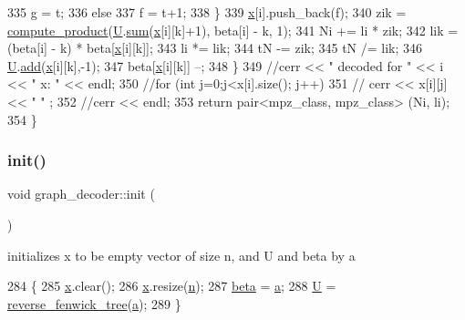 \begin{DoxyCode}
335         g = t;
336       \textcolor{keywordflow}{else}
337         f = t+1;
338     \}
339     \hyperlink{classgraph__decoder_aa3f2776afe387668cf7f68109428e14e}{x}[i].push\_back(f);
340     zik = \hyperlink{compression__helper_8cpp_ae2afb43aabe50f7d42aae8f82b5a35f4}{compute\_product}(\hyperlink{classgraph__decoder_a2fa9fec2cef06aaa410e57fb59d5c1ad}{U}.\hyperlink{classreverse__fenwick__tree_a672731fd6395b4853430073a099a80e6}{sum}(\hyperlink{classgraph__decoder_aa3f2776afe387668cf7f68109428e14e}{x}[i][k]+1), beta[i] - k, 1);
341     Ni += li * zik;
342     lik = (beta[i] - k) * beta[\hyperlink{classgraph__decoder_aa3f2776afe387668cf7f68109428e14e}{x}[i][k]];
343     li *= lik;
344     tN -= zik;
345     tN /= lik;
346     \hyperlink{classgraph__decoder_a2fa9fec2cef06aaa410e57fb59d5c1ad}{U}.\hyperlink{classreverse__fenwick__tree_a942d7f49b37e53ebfec3076d177691d7}{add}(\hyperlink{classgraph__decoder_aa3f2776afe387668cf7f68109428e14e}{x}[i][k],-1);
347     beta[\hyperlink{classgraph__decoder_aa3f2776afe387668cf7f68109428e14e}{x}[i][k]] --;
348   \}
349   \textcolor{comment}{//cerr << " decoded for " << i << " x: " << endl;}
350   \textcolor{comment}{//for (int j=0;j<x[i].size(); j++)}
351   \textcolor{comment}{//  cerr << x[i][j] << " " ;}
352   \textcolor{comment}{//cerr << endl;}
353   \textcolor{keywordflow}{return} pair<mpz\_class, mpz\_class> (Ni, li);
354 \}
\end{DoxyCode}
\mbox{\label{classgraph__decoder_a97a9dcd5af21ece86fa91adcb41ca9cc}} 
\subsubsection{\texorpdfstring{init()}{init()}}
{\footnotesize\ttfamily void graph\+\_\+decoder\+::init (\begin{DoxyParamCaption}{ }\end{DoxyParamCaption})}



initializes x to be empty vector of size n, and U and beta by a 


\begin{DoxyCode}
284 \{
285   \hyperlink{classgraph__decoder_aa3f2776afe387668cf7f68109428e14e}{x}.clear();
286   \hyperlink{classgraph__decoder_aa3f2776afe387668cf7f68109428e14e}{x}.resize(\hyperlink{classgraph__decoder_a6bc1e72b2f7a913d14b789a6c2d92c1e}{n});
287   \hyperlink{classgraph__decoder_aa57c11e4c09c52101682ff83286162f7}{beta} = \hyperlink{classgraph__decoder_a9dd7c3c11b8a45a12cb7c3c2d2bfa2cc}{a};
288   \hyperlink{classgraph__decoder_a2fa9fec2cef06aaa410e57fb59d5c1ad}{U} = \hyperlink{classreverse__fenwick__tree}{reverse\_fenwick\_tree}(\hyperlink{classgraph__decoder_a9dd7c3c11b8a45a12cb7c3c2d2bfa2cc}{a});
289 \}
\end{DoxyCode}


